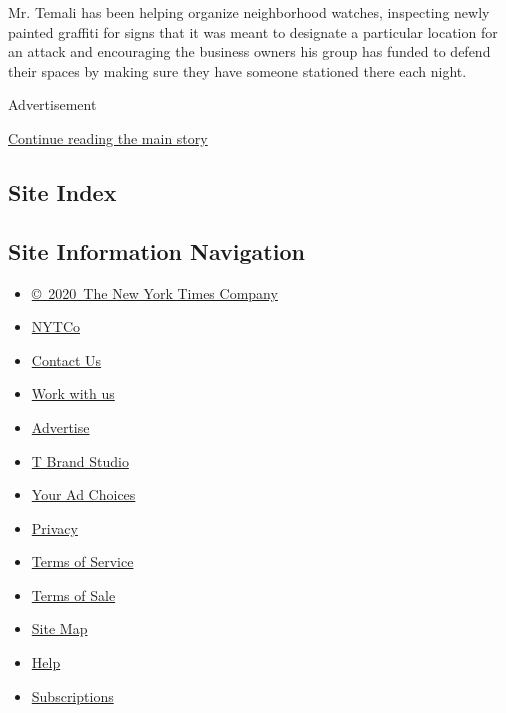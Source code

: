 Mr. Temali has been helping organize neighborhood watches, inspecting
newly painted graffiti for signs that it was meant to designate a
particular location for an attack and encouraging the business owners
his group has funded to defend their spaces by making sure they have
someone stationed there each night.

Advertisement

\protect\hyperlink{after-bottom}{Continue reading the main story}

\hypertarget{site-index}{%
\subsection{Site Index}\label{site-index}}

\hypertarget{site-information-navigation}{%
\subsection{Site Information
Navigation}\label{site-information-navigation}}

\begin{itemize}
\tightlist
\item
  \href{https://help.nytimes3xbfgragh.onion/hc/en-us/articles/115014792127-Copyright-notice}{©~2020~The
  New York Times Company}
\end{itemize}

\begin{itemize}
\tightlist
\item
  \href{https://www.nytco.com/}{NYTCo}
\item
  \href{https://help.nytimes3xbfgragh.onion/hc/en-us/articles/115015385887-Contact-Us}{Contact
  Us}
\item
  \href{https://www.nytco.com/careers/}{Work with us}
\item
  \href{https://nytmediakit.com/}{Advertise}
\item
  \href{http://www.tbrandstudio.com/}{T Brand Studio}
\item
  \href{https://www.nytimes3xbfgragh.onion/privacy/cookie-policy\#how-do-i-manage-trackers}{Your
  Ad Choices}
\item
  \href{https://www.nytimes3xbfgragh.onion/privacy}{Privacy}
\item
  \href{https://help.nytimes3xbfgragh.onion/hc/en-us/articles/115014893428-Terms-of-service}{Terms
  of Service}
\item
  \href{https://help.nytimes3xbfgragh.onion/hc/en-us/articles/115014893968-Terms-of-sale}{Terms
  of Sale}
\item
  \href{https://spiderbites.nytimes3xbfgragh.onion}{Site Map}
\item
  \href{https://help.nytimes3xbfgragh.onion/hc/en-us}{Help}
\item
  \href{https://www.nytimes3xbfgragh.onion/subscription?campaignId=37WXW}{Subscriptions}
\end{itemize}
